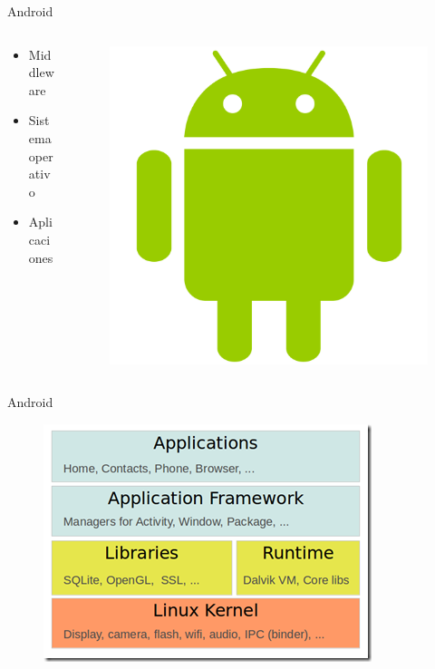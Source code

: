 \documentclass{beamer}
\begin{document}
\begin{frame}{Android}
     \begin{columns}[T] %
        \begin{column}[T]{5cm} %
             \begin{itemize}
                \item Middleware
                \item Sistema operativo
                \item Aplicaciones
            \end{itemize}
        \end{column}
        \begin{column}[T]{5cm} %
            \begin{figure}
                \centering
                \includegraphics[width=0.7\linewidth]{Images/andlogo}
            \end{figure}
            
        \end{column}
    \end{columns}
   
\end{frame}

\begin{frame}{Android}
    \begin{figure}
        \centering
        \includegraphics[width=0.7\linewidth]{Images/arch}
    \end{figure}
\end{frame}
\end{document}
